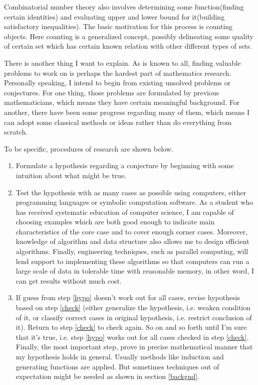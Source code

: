 \documentclass[12pt]{article}
\begin{document}
Combinatorial number theory also involves determining some function(finding certain identities) and evaluating upper and lower bound for it(building satisfactory inequalities). The basic motivation for this process is counting objects. Here counting is a generalized concept, possibly delineating some quality of certain set which has certain known relation with other different types of sets.

There is another thing I want to explain. As is known to all, finding valuable problems to work on is perhaps the hardest part of mathematics research. Personally speaking, I intend to begin from existing unsolved problems or conjectures. For one thing, those problems are formulated by previous mathematicians, which means they have certain meaningful background. For another, there have been some progress regarding many of them, which means I can adopt some classical methods or ideas rather than do everything from scratch.

To be specific, procedures of research are shown below. 

\begin{enumerate}
\item \label{hypo} Formulate a hypothesis regarding a conjecture by beginning with some intuition about what might be true. 
\item \label{check} Test the hypothesis with as many cases as possible using computers, either programming languages or symbolic computation software. As a student who has received systematic education of computer science, I am capable of choosing examples which are both good enough to indicate main characteristics of the core case and to cover enough corner cases. Moreover, knowledge of algorithm and data structure also allows me to design efficient algorithms. Finally, engineering techniques, such as parallel computing, will lend support to implementing these algorithms so that computers can run a large scale of data in tolerable time with reasonable memory, in other word, I can get results without much cost.
\item If guess from step \ref{hypo} doesn't work out for all cases, revise hypothesis based on step \ref{check} (either generalize the hypothesis, i.e. weaken condition of it, or classify correct cases in original hypothesis, i.e. restrict conclusion of it). Return to step \ref{check} to check again. So on and so forth until I'm sure that it's true, i.e. step \ref{hypo} works out for all cases checked in step \ref{check}. Finally, the most important step, prove in precise mathematical manner that my hypothesis holds in general. Usually methods like induction and generating functions are applied. But sometimes techniques out of expectation might be needed as shown in section \ref{backgnd}.
\end{enumerate}
\end{document}
